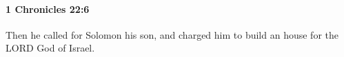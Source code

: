 
		\paragraph{1 Chronicles 22:6} %
			\label{1CHRONICLES-22-6}

			Then he called for Solomon his son, and charged him to build an house for the LORD God of Israel.


